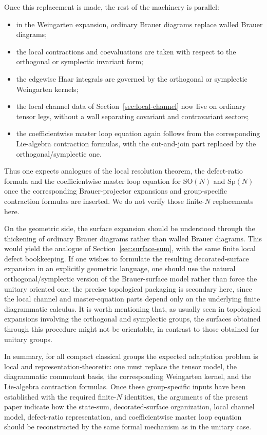 \documentclass[11pt,a4paper,reqno]{article}
\theoremstyle{definition}
\theoremstyle{remark}
\newcommand\SO{{\mathrm{SO}}}
\newcommand\Sp{{\mathrm{Sp}}}
\begin{document}
Once this replacement is made, the rest of the machinery is parallel:
\begin{itemize}
\item in the Weingarten expansion, ordinary Brauer diagrams replace walled Brauer diagrams;
\item the local contractions and coevaluations are taken with respect to the orthogonal or symplectic invariant form;
\item the edgewise Haar integrals are governed by the orthogonal or symplectic Weingarten kernels;
\item the local channel data of Section~\ref{sec:local-channel} now live on ordinary tensor legs, without a wall separating covariant and contravariant sectors;
\item the coefficientwise master loop equation again follows from the corresponding Lie-algebra contraction formulas, with the cut-and-join part replaced by the orthogonal/symplectic one.
\end{itemize}

Thus one expects analogues of the local resolution theorem, the defect-ratio formula and the coefficientwise master loop equation for $\SO(N)$ and $\Sp(N)$ once the corresponding Brauer-projector expansions and group-specific contraction formulas are inserted. We do not verify those finite-$N$ replacements here.

\medskip

On the geometric side, the surface expansion should be understood through the thickening of ordinary Brauer diagrams rather than walled Brauer diagrams. This would yield the analogue of Section~\ref{sec:surface-sum}, with the same finite local defect bookkeeping. If one wishes to formulate the resulting decorated-surface expansion in an explicitly geometric language, one should use the natural orthogonal/symplectic version of the Brauer-surface model rather than force the unitary oriented one; the precise topological packaging is secondary here, since the local channel and master-equation parts depend only on the underlying finite diagrammatic calculus. It is worth mentioning that, as usually seen in topological expansions involving the orthogonal and symplectic groups, the surfaces obtained through this procedure might not be orientable, in contrast to those obtained for unitary groups.

\medskip

In summary, for all compact classical groups the expected adaptation problem is local and representation-theoretic: one must replace the tensor model, the diagrammatic commutant basis, the corresponding Weingarten kernel, and the Lie-algebra contraction formulas. Once these group-specific inputs have been established with the required finite-$N$ identities, the arguments of the present paper indicate how the state-sum, decorated-surface organization, local channel model, defect-ratio representation, and coefficientwise master loop equation should be reconstructed by the same formal mechanism as in the unitary case.



\end{document}
